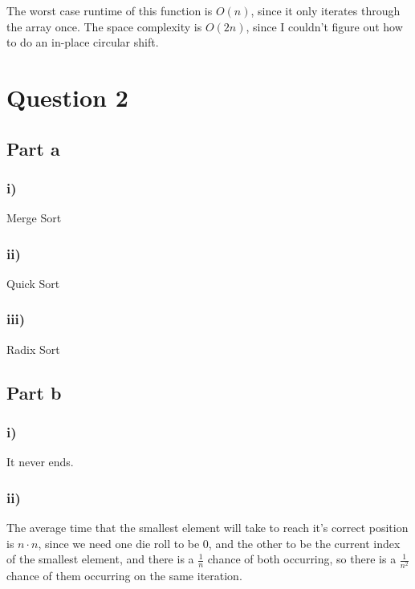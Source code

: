 \documentclass{article}
\begin{document}


The worst case runtime of this function is $O(n)$, since it only iterates
through the array once. The space complexity is $O(2n)$, since I couldn't figure
out how to do an in-place circular shift.

\section{Question 2}

\subsection{Part a}

\subsubsection{i)}

Merge Sort

\subsubsection{ii)}

Quick Sort

\subsubsection{iii)}

Radix Sort

\subsection{Part b}

\subsubsection{i)}

It never ends.

\subsubsection{ii)}

The average time that the smallest element will take to reach it's correct
position is $n \cdot n$, since we need one die roll to be 0, and the other to be
the current index of the smallest element, and there is a $\frac{1}{n}$ chance
of both occurring, so there is a $\frac{1}{n^2}$ chance of them occurring on the
same iteration.
\end{document}
